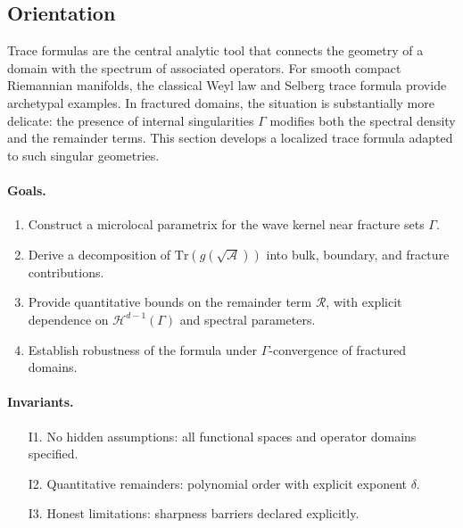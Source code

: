 \subsection*{Orientation}
Trace formulas are the central analytic tool that connects the
geometry of a domain with the spectrum of associated operators.
For smooth compact Riemannian manifolds, the classical
Weyl law and Selberg trace formula provide archetypal examples.
In fractured domains, the situation is substantially more delicate:
the presence of internal singularities $\Gamma$ modifies both
the spectral density and the remainder terms. This section develops
a localized trace formula adapted to such singular geometries.

\paragraph{Goals.}
\begin{enumerate}[label=G\arabic*.]
\item Construct a microlocal parametrix for the wave kernel near
fracture sets $\Gamma$.
\item Derive a decomposition of $\mathrm{Tr}(g(\sqrt{\mathcal{A}}))$
into bulk, boundary, and fracture contributions.
\item Provide quantitative bounds on the remainder term $\mathcal{R}$,
with explicit dependence on $\mathcal{H}^{d-1}(\Gamma)$ and spectral
parameters.
\item Establish robustness of the formula under $\Gamma$-convergence
of fractured domains.
\end{enumerate}

\paragraph{Invariants.}
\begin{itemize}
\item[I1.] No hidden assumptions: all functional spaces and operator
domains specified.
\item[I2.] Quantitative remainders: polynomial order with explicit
exponent $\delta$.
\item[I3.] Honest limitations: sharpness barriers declared explicitly.
\end{itemize}

\bigskip


